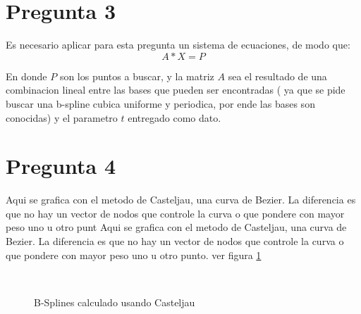 \documentclass[a4paper,10pt]{article}
\begin{document}
\newpage
\section{Pregunta 3}
Es necesario aplicar para esta pregunta un sistema de ecuaciones, de modo que:
$$A*X=P$$

En donde $P$ son los puntos a buscar, y la matriz $A$ sea el
resultado de una combinacion lineal entre las bases que pueden ser encontradas
( ya que se pide buscar una b-spline cubica uniforme y periodica, por ende las
bases son conocidas) y el parametro $t$ entregado como dato.

\section{Pregunta 4}
Aqui se grafica con el metodo de Casteljau, una curva de Bezier. La diferencia es que no hay un vector de nodos que
controle la curva o que pondere con mayor peso uno u otro punt
Aqui se grafica con el metodo de Casteljau, una curva de Bezier. La diferencia es que no hay un vector de nodos que
controle la curva o que pondere con mayor peso uno u otro punto. ver figura \ref{fig:p4}
\begin{figure}[ht!]
  \centering
  ~ 
  \caption{B-Splines calculado usando Casteljau}
  \label{fig:p4}
\end{figure}
\end{document}
